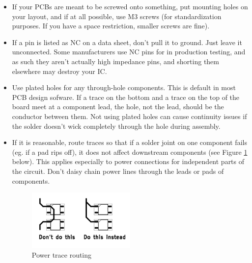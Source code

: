 \documentclass{article}
\begin{document}
\begin{itemize}
\item If your PCBs are meant to be screwed onto something, put mounting holes on your layout, and if at all possible, use M3 screws (for standardization purposes. If you have a space restriction, smaller screws are fine).
\item If a pin is listed as NC on a data sheet, don't pull it to ground. Just leave it unconnected. Some manufacturers use NC pins for in production testing, and as such they aren't actually high impedance pins, and shorting them elsewhere may destroy your IC.
\item Use plated holes for any through-hole components. This is default in most PCB design sofware. If a trace on the bottom and a trace on the top of the board meet at a component lead, the hole, not the lead, should be the conductor between them. Not using plated holes can cause continuity issues if the solder doesn't wick completely through the hole during assembly.
\item If it is reasonable, route traces so that if a solder joint on one component fails (eg. if a pad rips off), it does not affect downstream components (see Figure \ref{powertraces} below). This applies especially to power connections for independent parts of the circuit. Don't daisy chain power lines through the leads or pads of components.

\begin{figure}[h]
    \centering
    \includegraphics[height=3cm]{power_traces.png}
    \caption{Power trace routing}
    \label{powertraces}
\end{figure}


\end{itemize}
\end{document}
